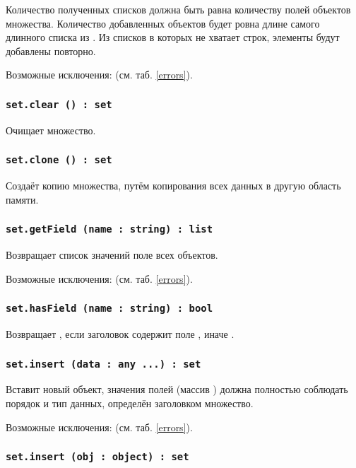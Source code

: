 Количество полученных списков должна быть равна количеству полей объектов множества. Количество добавленных объектов будет ровна длине самого длинного списка из . Из списков в которых не хватает строк, элементы будут добавлены повторно.

Возможные исключения:  (см. таб. \ref{errors}).

\subsubsection{\lstinline|set.clear () : set|}

Очищает множество.

\subsubsection{\lstinline|set.clone () : set|}

Создаёт копию множества, путём копирования всех данных в другую область памяти.

\subsubsection{\lstinline|set.getField (name : string) : list|}

Возвращает список значений поле  всех объектов.

Возможные исключения:  (см. таб. \ref{errors}).

\subsubsection{\lstinline|set.hasField (name : string) : bool|}

Возвращает \true, если заголовок содержит поле , иначе \false.

\subsubsection{\lstinline|set.insert (data : any ...) : set|}

Вставит новый объект, значения полей (массив ) должна полностью соблюдать порядок и тип данных, определён заголовком множество.

Возможные исключения:  (см. таб. \ref{errors}).

\subsubsection{\lstinline|set.insert (obj : object) : set|}

